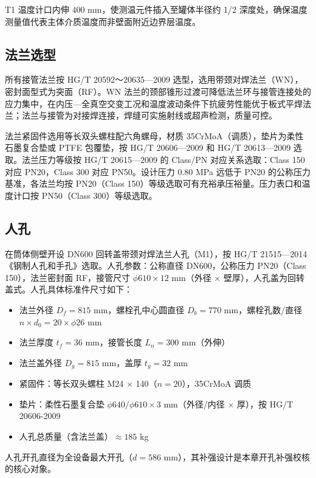 T1 温度计口内伸 $400$ mm，使测温元件插入至罐体半径约 1/2 深度处，确保温度测量值代表主体介质温度而非壁面附近边界层温度。

\subsection{法兰选型}

所有接管法兰按 HG/T 20592～20635—2009 选型\cite{hgt20592-2009}，选用带颈对焊法兰（WN），密封面型式为突面（RF）。WN 法兰的颈部锥形过渡可降低法兰环与接管连接处的应力集中，在内压—全真空交变工况和温度波动条件下抗疲劳性能优于板式平焊法兰；法兰与接管为对接焊连接，焊缝可实施射线或超声检测，质量可控。

法兰紧固件选用等长双头螺柱配六角螺母，材质 35CrMoA（调质），垫片为柔性石墨复合垫或 PTFE 包覆垫，按 HG/T 20606—2009\cite{hgt20606-2009} 和 HG/T 20613—2009\cite{hgt20613-2009} 选取。法兰压力等级按 HG/T 20615—2009 的 Class/PN 对应关系选取：Class 150 对应 PN20，Class 300 对应 PN50。设计压力 $0.80$ MPa 远低于 PN20 的公称压力基准，各法兰均按 PN20（Class 150）等级选取可有充裕承压裕量。压力表口和温度计口按 PN50（Class 300）等级选取。

\subsection{人孔}

在筒体侧壁开设 DN600 回转盖带颈对焊法兰人孔（M1），按 HG/T 21515—2014《钢制人孔和手孔》选取\cite{hgt21514-2014}。人孔参数：公称直径 DN600，公称压力 PN20（Class 150），法兰密封面 RF，接管尺寸 $\phi 610 \times 12$ mm（外径 $\times$ 壁厚），人孔盖为回转盖式。人孔具体标准件尺寸如下：

\begin{itemize}
    \item 法兰外径 $D_f = 815$ mm，螺栓孔中心圆直径 $D_b = 770$ mm，螺栓孔数/直径 $n \times d_0 = 20 \times \phi 26$ mm
    \item 法兰厚度 $t_f = 36$ mm，接管长度 $L_n = 300$ mm（外伸）
    \item 法兰盖外径 $D_g = 815$ mm，盖厚 $t_g = 32$ mm
    \item 紧固件：等长双头螺柱 M24 $\times$ 140（$n = 20$），35CrMoA 调质
    \item 垫片：柔性石墨复合垫 $\phi 640/\phi 610 \times 3$ mm（外径/内径 $\times$ 厚），按 HG/T 20606-2009
    \item 人孔总质量（含法兰盖）$\approx 185$ kg
\end{itemize}

人孔开孔直径为全设备最大开孔（$d = 586$ mm），其补强设计是本章开孔补强校核的核心对象。

